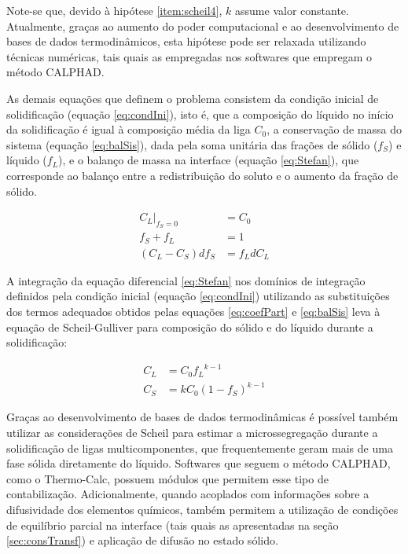 Note-se que, devido à hipótese \ref{item:scheil4}, $k$ assume valor constante. Atualmente, graças ao aumento do poder computacional e ao desenvolvimento de bases de dados termodinâmicos, esta hipótese pode ser relaxada utilizando técnicas numéricas, tais quais as empregadas nos softwares que empregam o método CALPHAD. %


As demais equações que definem o problema consistem da condição inicial de solidificação (equação \ref{eq:condIni}), isto é, que a composição do líquido no início da solidificação é igual à composição média da liga $C_0$, a conservação de massa do sistema (equação \ref{eq:balSis}), dada pela soma unitária das frações de sólido ($f_S$) e líquido ($f_L$), e o balanço de massa na interface (equação \ref{eq:Stefan}), que corresponde ao balanço entre a redistribuição do soluto e o aumento da fração de sólido.

\begin{subequations}[resume]
  \begin{align}
    \label{eq:condIni}\left.C_L\right|_{f_S=0} &= C_0\\
    \label{eq:balSis}f_S + f_L &= 1\\
    \label{eq:Stefan}\left(C_L - C_S\right) df_S &= f_L dC_L
  \end{align}
\end{subequations}

A integração da equação diferencial \ref{eq:Stefan} nos domínios de integração definidos pela condição inicial (equação \ref{eq:condIni}) utilizando as substituições dos termos adequados obtidos pelas equações \ref{eq:coefPart} e \ref{eq:balSis} leva à equação de Scheil-Gulliver para composição do sólido e do líquido durante a solidificação:

\begin{subequations}
  \begin{align}
    C_L &= C_0 {f_L}^{k-1}\\
    \label{eq:C_S}C_S &= k C_0\left(1 - f_S\right)^{k-1}
  \end{align}
\end{subequations}

Graças ao desenvolvimento de bases de dados termodinâmicas é possível também utilizar as considerações de Scheil para estimar a microssegregação durante a solidificação de ligas multicomponentes, que frequentemente geram mais de uma fase sólida diretamente do líquido. Softwares que seguem o método CALPHAD, como o Thermo-Calc\textregistered, possuem módulos que permitem esse tipo de contabilização. Adicionalmente, quando acoplados com informações sobre a difusividade dos elementos químicos, também permitem a utilização de condições de equilíbrio parcial na interface (tais quais as apresentadas na seção \ref{sec:consTransf}) e aplicação de difusão no estado sólido\cite{Chen2002,Larouche2007}.

